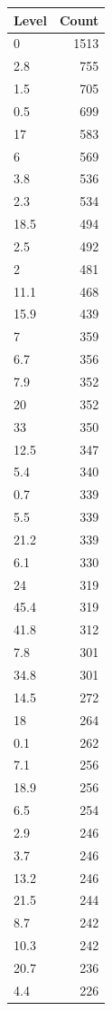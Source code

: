 \begin{table}[ht]
\centering
\begin{tabular}{lr}
  \hline
Level & Count \\ 
  \hline
0 & 1513 \\ 
  2.8 & 755 \\ 
  1.5 & 705 \\ 
  0.5 & 699 \\ 
  17 & 583 \\ 
  6 & 569 \\ 
  3.8 & 536 \\ 
  2.3 & 534 \\ 
  18.5 & 494 \\ 
  2.5 & 492 \\ 
  2 & 481 \\ 
  11.1 & 468 \\ 
  15.9 & 439 \\ 
  7 & 359 \\ 
  6.7 & 356 \\ 
  7.9 & 352 \\ 
  20 & 352 \\ 
  33 & 350 \\ 
  12.5 & 347 \\ 
  5.4 & 340 \\ 
  0.7 & 339 \\ 
  5.5 & 339 \\ 
  21.2 & 339 \\ 
  6.1 & 330 \\ 
  24 & 319 \\ 
  45.4 & 319 \\ 
  41.8 & 312 \\ 
  7.8 & 301 \\ 
  34.8 & 301 \\ 
  14.5 & 272 \\ 
  18 & 264 \\ 
  0.1 & 262 \\ 
  7.1 & 256 \\ 
  18.9 & 256 \\ 
  6.5 & 254 \\ 
  2.9 & 246 \\ 
  3.7 & 246 \\ 
  13.2 & 246 \\ 
  21.5 & 244 \\ 
  8.7 & 242 \\ 
  10.3 & 242 \\ 
  20.7 & 236 \\ 
  4.4 & 226 \\ 

\end{tabular}
\end{table}
